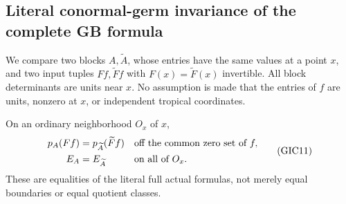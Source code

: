 \subsection{Literal conormal-germ invariance of the complete GB formula}

We compare two blocks $A,\widetilde A$, whose entries have the
same values at a point $x$, and two input tuples $Ff,\widetilde Ff$
with $F(x)=\widetilde F(x)$ invertible.  All block determinants
are units near $x$.  No assumption is made that the entries of
$f$ are units, nonzero at $x$, or independent tropical coordinates.

\begin{theorem}
On an ordinary neighborhood $O_x$ of $x$,
\[
 \begin{split}
 p_A(Ff)&=p_{\widetilde A}(\widetilde Ff)
                    &&\hbox{off the common zero set of }f,\\
 E_A&=E_{\widetilde A}
                    &&\hbox{on all of }O_x.
 \end{split}
 \tag{GIC11}
\]
These are equalities of the literal full actual formulas,
not merely equal boundaries or equal quotient classes.
\end{theorem}

